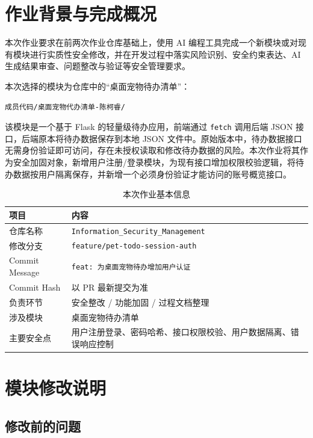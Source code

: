 \documentclass[12pt,a4paper]{ctexart}
\begin{document}
\tableofcontents
\newpage

\section{作业背景与完成概况}

本次作业要求在前两次作业仓库基础上，使用 AI 编程工具完成一个新模块或对现有模块进行实质性安全修改，并在开发过程中落实风险识别、安全约束表达、AI 生成结果审查、问题整改与验证等安全管理要求。

本次选择的模块为仓库中的“桌面宠物待办清单”：

\begin{verbatim}
成员代码/桌面宠物代办清单-陈柯睿/
\end{verbatim}

该模块是一个基于 Flask 的轻量级待办应用，前端通过 \texttt{fetch} 调用后端 JSON 接口，后端原本将待办数据保存到本地 JSON 文件中。原始版本中，待办数据接口无需身份验证即可访问，存在未授权读取和修改待办数据的风险。本次作业将其作为安全加固对象，新增用户注册/登录模块，为现有接口增加权限校验逻辑，将待办数据按用户隔离保存，并新增一个必须身份验证才能访问的账号概览接口。

\begin{table}[H]
    \centering
    \caption{本次作业基本信息}
    \begin{tabularx}{\textwidth}{C{3.2cm}Y}
        \toprule
        项目 & 内容 \\
        \midrule
        仓库名称 & \texttt{Information\_Security\_Management} \\
        修改分支 & \texttt{feature/pet-todo-session-auth} \\
        Commit Message & \texttt{feat: 为桌面宠物待办增加用户认证} \\
        Commit Hash & 以 PR 最新提交为准 \\
        负责环节 & 安全整改 / 功能加固 / 过程文档整理 \\
        涉及模块 & 桌面宠物待办清单 \\
        主要安全点 & 用户注册登录、密码哈希、接口权限校验、用户数据隔离、错误响应控制 \\
        \bottomrule
    \end{tabularx}
\end{table}

\section{模块修改说明}

\subsection{修改前的问题}
\end{document}
